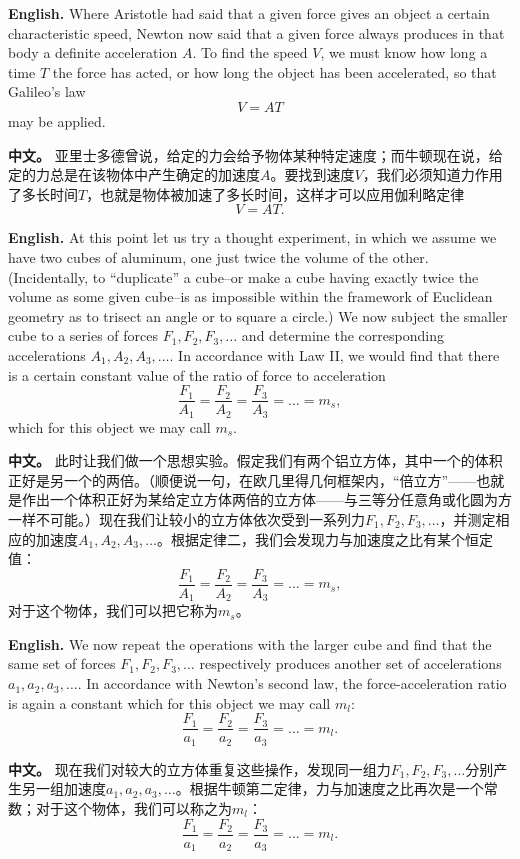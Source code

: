 \noindent\textbf{English.} Where Aristotle had said that a given force gives an object a certain characteristic speed, Newton now said that a given force always produces in that body a definite acceleration $A$. To find the speed $V$, we must know how long a time $T$ the force has acted, or how long the object has been accelerated, so that Galileo's law
\[
V = AT
\]
may be applied.
\par\noindent\textbf{中文。} 亚里士多德曾说，给定的力会给予物体某种特定速度；而牛顿现在说，给定的力总是在该物体中产生确定的加速度$A$。要找到速度$V$，我们必须知道力作用了多长时间$T$，也就是物体被加速了多长时间，这样才可以应用伽利略定律
\[
V = AT.
\]
\medskip

\noindent\textbf{English.} At this point let us try a thought experiment, in which we assume we have two cubes of aluminum, one just twice the volume of the other. (Incidentally, to ``duplicate'' a cube--or make a cube having exactly twice the volume as some given cube--is as impossible within the framework of Euclidean geometry as to trisect an angle or to square a circle.) We now subject the smaller cube to a series of forces $F_{1}, F_{2}, F_{3}, \ldots$ and determine the corresponding accelerations $A_{1}, A_{2}, A_{3}, \ldots$. In accordance with Law II, we would find that there is a certain constant value of the ratio of force to acceleration
\[
\frac{F_{1}}{A_{1}} = \frac{F_{2}}{A_{2}} = \frac{F_{3}}{A_{3}} = \dots = m_{s},
\]
which for this object we may call $m_s$.
\par\noindent\textbf{中文。} 此时让我们做一个思想实验。假定我们有两个铝立方体，其中一个的体积正好是另一个的两倍。（顺便说一句，在欧几里得几何框架内，“倍立方”——也就是作出一个体积正好为某给定立方体两倍的立方体——与三等分任意角或化圆为方一样不可能。）现在我们让较小的立方体依次受到一系列力$F_{1}, F_{2}, F_{3}, \ldots$，并测定相应的加速度$A_{1}, A_{2}, A_{3}, \ldots$。根据定律二，我们会发现力与加速度之比有某个恒定值：
\[
\frac{F_{1}}{A_{1}} = \frac{F_{2}}{A_{2}} = \frac{F_{3}}{A_{3}} = \dots = m_{s},
\]
对于这个物体，我们可以把它称为$m_s$。
\medskip

\noindent\textbf{English.} We now repeat the operations with the larger cube and find that the same set of forces $F_1, F_2, F_3, \ldots$ respectively produces another set of accelerations $a_1, a_2, a_3, \ldots$. In accordance with Newton's second law, the force-acceleration ratio is again a constant which for this object we may call $m_l$:
\[
\frac{F_{1}}{a_{1}} = \frac{F_{2}}{a_{2}} = \frac{F_{3}}{a_{3}} = \dots = m_{l}.
\]
\par\noindent\textbf{中文。} 现在我们对较大的立方体重复这些操作，发现同一组力$F_1, F_2, F_3, \ldots$分别产生另一组加速度$a_1, a_2, a_3, \ldots$。根据牛顿第二定律，力与加速度之比再次是一个常数；对于这个物体，我们可以称之为$m_l$：
\[
\frac{F_{1}}{a_{1}} = \frac{F_{2}}{a_{2}} = \frac{F_{3}}{a_{3}} = \dots = m_{l}.
\]
\medskip

